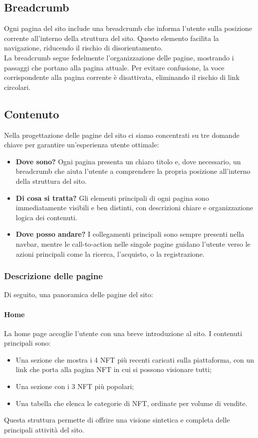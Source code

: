 \documentclass[10pt]{article}
\begin{document}
\subsection{Breadcrumb}
Ogni pagina del sito include una breadcrumb che informa l'utente sulla posizione corrente all'interno della struttura del sito. Questo elemento facilita la navigazione, riducendo il rischio di disorientamento.\\
La breadcrumb segue fedelmente l’organizzazione delle pagine, mostrando i passaggi che portano alla pagina attuale. Per evitare confusione, la voce corrispondente alla pagina corrente è disattivata, eliminando il rischio di link circolari.

\subsection{Contenuto} Nella progettazione delle pagine del sito ci siamo concentrati su tre domande chiave per garantire un’esperienza utente ottimale: \begin{itemize} \item \textbf{Dove sono?} Ogni pagina presenta un chiaro titolo e, dove necessario, un breadcrumb che aiuta l’utente a comprendere la propria posizione all’interno della struttura del sito. \item \textbf{Di cosa si tratta?} Gli elementi principali di ogni pagina sono immediatamente visibili e ben distinti, con descrizioni chiare e organizzazione logica dei contenuti. \item \textbf{Dove posso andare?} I collegamenti principali sono sempre presenti nella navbar, mentre le call-to-action nelle singole pagine guidano l’utente verso le azioni principali come la ricerca, l’acquisto, o la registrazione. \end{itemize}

\subsubsection{Descrizione delle pagine} Di seguito, una panoramica delle pagine del sito:

\paragraph{Home} La home page accoglie l’utente con una breve introduzione al sito. I contenuti principali sono:
\begin{itemize}
    \item Una sezione che mostra i 4 NFT più recenti caricati sulla piattaforma, con un link che porta alla pagina NFT in cui si possono visionare tutti;
    \item Una sezione con i 3 NFT più popolari;
    \item Una tabella che elenca le categorie di NFT, ordinate per volume di vendite.
\end{itemize}
Questa struttura permette di offrire una visione sintetica e completa delle principali attività del sito.
\end{document}
